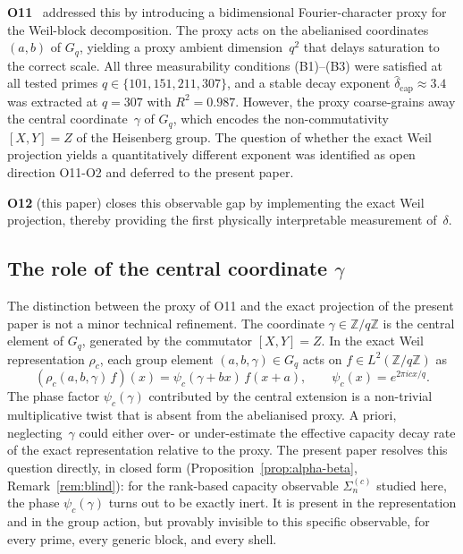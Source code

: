 \documentclass[11pt,a4paper]{article}
\begin{document}
    \textbf{O11}~\cite{Beau2026a15} addressed this by introducing a bidimensional
    Fourier-character proxy for the Weil-block decomposition.
    The proxy acts on the abelianised coordinates $(a,b)$ of $G_q$, yielding a proxy
    ambient dimension~$q^2$ that delays saturation to the correct scale.
    All three measurability conditions (B1)--(B3) were satisfied at all tested primes
    $q\in\{101,151,211,307\}$, and a stable decay exponent
    $\hat{\delta}_{\mathrm{cap}}\approx 3.4$ was extracted at $q=307$ with $R^2=0.987$.
    However, the proxy coarse-grains away the central coordinate~$\gamma$ of $G_q$,
    which encodes the non-commutativity $[X,Y]=Z$ of the Heisenberg group.
    The question of whether the exact Weil projection yields a quantitatively different
    exponent was identified as open direction O11-O2 and deferred to the present paper.

    \textbf{O12} (this paper) closes this observable gap by implementing the exact Weil
    projection, thereby providing the first physically interpretable measurement of~$\delta$.

  \subsection{The role of the central coordinate $\gamma$}

    The distinction between the proxy of O11 and the exact projection of the present paper
    is not a minor technical refinement.
    The coordinate $\gamma\in\mathbb{Z}/q\mathbb{Z}$ is the central element of $G_q$,
    generated by the commutator $[X,Y]=Z$.
    In the exact Weil representation $\rho_c$, each group element $(a,b,\gamma)\in G_q$
    acts on $f\in L^2(\mathbb{Z}/q\mathbb{Z})$ as
    \begin{equation}
      (\rho_c(a,b,\gamma)\,f)(x) = \psi_c(\gamma + bx)\,f(x+a),
      \qquad \psi_c(x) = e^{2\pi i c x/q}.
      \label{eq:weil-exact}
    \end{equation}
    The phase factor $\psi_c(\gamma)$ contributed by the central extension is a
    non-trivial multiplicative twist that is absent from the abelianised proxy.
    A priori, neglecting~$\gamma$ could either over- or under-estimate the effective
    capacity decay rate of the exact representation relative to the proxy.
    The present paper resolves this question directly, in closed form
    (Proposition~\ref{prop:alpha-beta}, Remark~\ref{rem:blind}): for the rank-based
    capacity observable $\Sigma_n^{(c)}$ studied here, the phase $\psi_c(\gamma)$ turns out
    to be exactly inert. It is present in the representation and in the group action, but
    provably invisible to this specific observable, for every prime, every generic block,
    and every shell.
\end{document}
